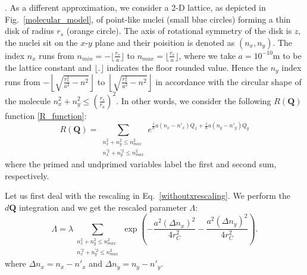 \documentclass[12pt,groupedaddress,pra,aps]{revtex4-1}
\begin{document}
.
As a different approximation, we consider a 2-D lattice, as depicted  in Fig.~\ref{molecular_model}, of point-like nuclei (small blue circles) forming a thin disk  of radius $r_s$ (orange circle).  The axis of rotational symmetry of the disk is $z$, the nuclei sit on the $x$-$y$ plane and their poisition is denoted as $(n_x,n_y)$. The index $n_x$ runs from $n_{min}=-\lfloor \frac{r_s}{a} \rfloor$ to $n_{max}=\lfloor \frac{r_s}{a} \rfloor$, where we take $a=10^{-10}\text{m}$ to be the lattice constant and $\lfloor . \rfloor $ indicates the floor rounded value. Hence the $n_y$ index runs from $-\left\lfloor\sqrt{\frac{r_s^2}{a^2}-n^2}\right\rfloor$ to $\left\lfloor \sqrt{\frac{r_s^2}{a^2}-n^2}\right\rfloor$ in accordance with the circular shape of the molecule $n_x^2 +n_y^2 \leq \left(\frac{r_s}{r_a}\right)^2$.  In other words, we consider the following $R(\bm{Q})$ function \eqref{R_function}:
\begin{equation}\label{R_function_sums}
R(\bm{Q})=
\sum _{\substack{n_x^2+n_y^2 \leq n_{max}^2 \\
n_x^{\prime 2}+n_y^{\prime 2} \leq n_{max}^2}} 
e^{ \frac{i}{\hbar}a(n_x-n'_x) Q_x  +  \frac{i}{\hbar}a(n_y-n'_y) Q_y } 
\end{equation}
where the primed and undprimed variables label the first and second sum, respectively.

Let us first deal with the rescaling in Eq.~\eqref{withoutxrescaling}. We perform the $d\bm{Q}$ integration and we get the rescaled parameter $\Lambda$:
\begin{equation}\label{no_x_term}
\Lambda=\lambda 
\sum _{\substack{n_x^2+n_y^2 \leq n_{max}^2 \\
n_x^{\prime 2}+n_y^{\prime 2} \leq n_{max}^2 }}
\exp \left(
-\frac{a^2 \left(\Delta n_x\right)^2}{4 r_C^2}
-\frac{a^2 \left(\Delta n_y\right)^2}{4 r_C^2}
\right).
\end{equation}
where $\Delta n_x=n_x-n'_x$ and $\Delta n_y=n_y-n'_y$.
\end{document}
